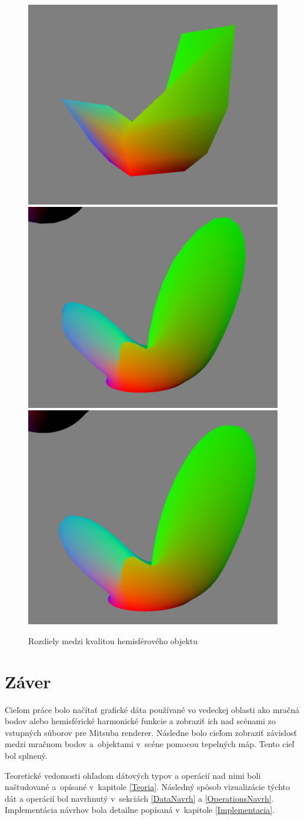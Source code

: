 \begin{figure}[b!]\label{HSGPorovnanie}
    \centering
    \includegraphics[width=0.45\linewidth]{obrazky-figures/5x5.png}
    \includegraphics[width=0.45\linewidth]{obrazky-figures/25x25.png}
    \includegraphics[width=0.45\linewidth]{obrazky-figures/50x50.png}
    \caption{Rozdiely medzi kvalitou hemisférového objektu}
\end{figure}

\chapter{Záver}
Cieľom práce bolo načítať grafické dáta používané vo vedeckej oblasti ako mračná bodov alebo hemisférické harmonické funkcie a zobraziť ich nad scénami zo vstupných súborov pre Mitsuba renderer. Následne bolo cieľom zobraziť závislosť medzi mračnom bodov a~objektami v~scéne pomocou tepelných máp. Tento cieľ bol splnený.

Teoretické vedomosti ohľadom dátových typov a operácií nad nimi boli naštudované a~opísané v~kapitole \ref{Teoria}. Následný spôsob vizualizácie týchto dát a operácií bol navrhnutý v~sekciách \ref{DataNavrh} a \ref{OperationsNavrh}. Implementácia návrhov bola detailne popísaná v~kapitole \ref{Implementacia}.

